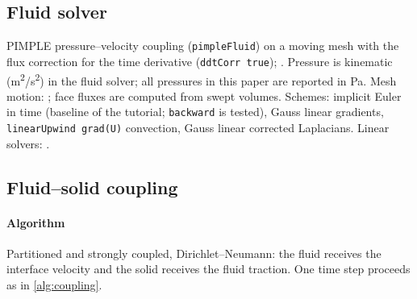\subsection{Fluid solver}\label{sec:methods:fluid}
PIMPLE pressure--velocity coupling (\texttt{pimpleFluid}) on a moving mesh
with the flux correction for the time derivative (\texttt{ddtCorr true});
. Pressure is kinematic (\si{m^2/s^2}) in the fluid
solver; all pressures in this paper are reported in \si{Pa}. Mesh motion:
; face fluxes are
computed from swept volumes. Schemes: implicit Euler in time (baseline of
the tutorial; \texttt{backward} is tested), Gauss linear gradients,
\texttt{linearUpwind grad(U)} convection, Gauss linear corrected
Laplacians. Linear solvers: .

\subsection{Fluid--solid coupling}\label{sec:methods:coupling}
\paragraph{Algorithm} Partitioned and strongly coupled, Dirichlet--Neumann:
the fluid receives the interface velocity and the solid receives the fluid
traction. One time step proceeds as in \cref{alg:coupling}.

